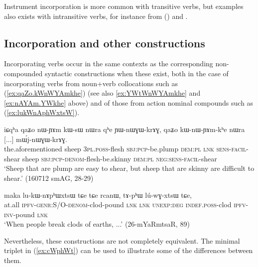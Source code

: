 Instrument incorporation is more common with transitive verbs, but examples also exists with intransitive verbs, for instance  from  () and .


\subsection{Incorporation and other constructions} \label{sec:incorp.vs.other}
Incorporating verbs occur in the same contexts as the corresponding non-com\-poun\-ded syntactic constructions when these exist, both in the case of incorporating verbs from noun+verb collocations such as  (\ref{ex:qaZo.kWnWYAmkhe}) (see also \ref{ex:YWtWnWYAmkhe} and \ref{ex:nAYAm.YWkhe} above) and of those from action nominal compounds such as  (\ref{ex:lukWnAphWxtsW}).

\begin{exe}
\ex \label{ex:qaZo.kWnWYAmkhe}
\gll iɕqʰa qaʑo nɯ-ɲɤm kɯ-sɯ nɯra qʰe ɲɯ-nɯɣɯ-krɤɣ, qaʑo kɯ-nɯ-ɲɤm-kʰe nɯra [...] mɯ́j-nɯɣɯ-krɤɣ. \\
the.aforementioned sheep \textsc{3pl}.\textsc{poss}-flesh \textsc{sbj}:\textsc{pcp}-be.plump \textsc{dem}:\textsc{pl} \textsc{lnk} \textsc{sens}-\textsc{facil}-shear sheep \textsc{sbj}:\textsc{pcp}-\textsc{denom}-flesh-be.skinny \textsc{dem}:\textsc{pl} {  } \textsc{neg}:\textsc{sens}-\textsc{facil}-shear \\
\glt `Sheep that are plump are easy to shear, but sheep that are skinny are difficult to shear.' (160712 smAG, 28-29)
\end{exe}

\begin{exe}
\ex \label{ex:lukWnAphWxtsW}
\gll maka lu-kɯ-nɤpʰɯxtsɯ tɕe tɕe rcanɯ, tɤ-pʰɯ lú-wɣ-xtsɯ tɕe, \\
at.all \textsc{ipfv}-\textsc{genr}:S/O-\textsc{denom}-clod-pound \textsc{lnk} \textsc{lnk} \textsc{unexp}:\textsc{deg} \textsc{indef}.\textsc{poss}-clod \textsc{ipfv}-\textsc{inv}-pound \textsc{lnk} \\
\glt `When people break clods of earths, ...' (26-mYaRmtsaR, 89)
\end{exe}

Nevertheless, these constructions are not completely equivalent. The minimal triplet in (\ref{ex:cWphWt}) can be used to illustrate some of the differences between them.

